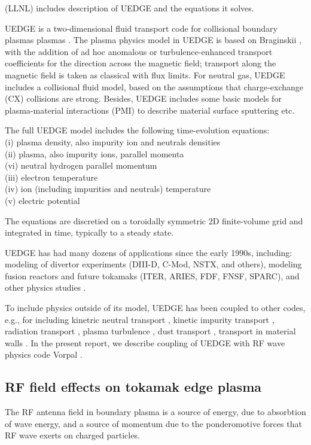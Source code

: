 (LLNL) includes description of UEDGE and the equations it solves.




UEDGE is a two-dimensional fluid transport code for collisional
boundary plasmas plasmas \cite{}. The plasma physics model in UEDGE is
based on Braginskii \cite{}, with the addition of ad hoc anomalous or
turbulence-enhanced transport coefficients for the direction across
the magnetic field; transport along the magnetic field is taken as
classical with flux limits. For neutral gas, UEDGE includes a
collisional fluid model, based on the assumptions that charge-exchange
(CX) collisions are strong. Besides, UEDGE includes some basic models
for plasma-material interactions (PMI) to describe material surface
sputtering etc.

The full UEDGE model includes the following time-evolution equations:\\
(i) plasma density, also impurity ion and neutrals densities \\
(ii) plasma, also impurity ions, parallel momenta \\
(vi) neutral hydrogen parallel momentum \\
(iii) electron temperature \\
(iv) ion (including impurities and neutrals) temperature \\
(v) electric potential

The equations are discretied on a toroidally symmetric 2D
finite-volume grid and integrated in time, typically to a steady
state.

UEDGE has had many dozens of applications since the early 1990s,
including: modeling of divertor experiments (DIII-D, C-Mod, NSTX, and
others), modeling fusion reactors and future tokamaks (ITER, ARIES,
FDF, FNSF, SPARC), and other physics studies \cite{}.

To include physics outside of its model, UEDGE has been coupled to other
codes, e.g., for including kinetric neutral transport \cite{}, kinetic
impurity transport \cite{}, radiation transport \cite{}, plasma
turbulence \cite{}, dust transport \cite{}, transport in material
walls \cite{}. In the present report, we describe coupling of UEDGE
with RF wave physics code Vorpal \cite{}.


\subsection{RF field effects on tokamak edge plasma}

The RF antenna field in boundary plasma is a source of energy, due to
absorbtion of wave energy, and a source of momentum due to the
ponderomotive forces that RF wave exerts on charged particles.

